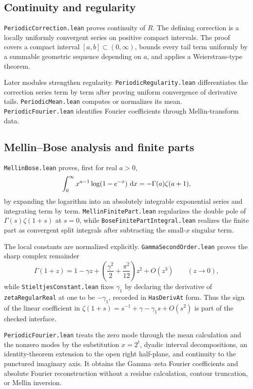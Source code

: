 \documentclass[11pt,oneside]{article}
\theoremstyle{definition}
\theoremstyle{remark}
\begin{document}
\subsection{Continuity and regularity}
\nolinkurl{PeriodicCorrection.lean} proves continuity of \(R\).  The defining correction is a locally uniformly convergent series on positive compact intervals.  The proof covers a compact interval \([a,b]\subset(0,\infty)\), bounds every tail term uniformly by a summable geometric sequence depending on \(a\), and applies a Weierstrass-type theorem.

Later modules strengthen regularity.  \nolinkurl{PeriodicRegularity.lean} differentiates the correction series term by term after proving uniform convergence of derivative tails.  \nolinkurl{PeriodicMean.lean} computes or normalizes its mean.  \nolinkurl{PeriodicFourier.lean} identifies Fourier coefficients through Mellin-transform data.

\subsection{Mellin--Bose analysis and finite parts}
\nolinkurl{MellinBose.lean} proves, first for real \(a>0\),
\[
 \int_0^\infty x^{a-1}\log(1-e^{-x})\,\mathop{}\!\mathrm{d} x
 =-\Gamma(a)\zeta(a+1),
\]
by expanding the logarithm into an absolutely integrable exponential series
and integrating term by term.  \nolinkurl{MellinFinitePart.lean} regularizes the
double pole of \(\Gamma(s)\zeta(1+s)\) at \(s=0\), while
\nolinkurl{BoseFinitePartIntegral.lean} realizes the finite part as convergent
split integrals after subtracting the small-\(x\) singular term.

The local constants are normalized explicitly.  \nolinkurl{GammaSecondOrder.lean}
proves the sharp complex remainder
\[
 \Gamma(1+z)=1-\gamma z+
 \left(\frac{\gamma^2}{2}+\frac{\pi^2}{12}\right)z^2+O(z^3)
 \qquad(z\to0),
\]
while \nolinkurl{StieltjesConstant.lean} fixes \(\gamma_1\) by declaring the
derivative of \nolinkurl{zetaRegularReal} at one to be \(-\gamma_1\), recorded
in \nolinkurl{HasDerivAt} form.  Thus the sign of the linear coefficient in
\(\zeta(1+s)=s^{-1}+\gamma-\gamma_1s+O(s^2)\) is part of the checked interface.

\nolinkurl{PeriodicFourier.lean} treats the zero mode through the mean calculation
and the nonzero modes by the substitution \(x=2^t\), dyadic interval
decompositions, an identity-theorem extension to the open right half-plane,
and continuity to the punctured imaginary axis.  It obtains the Gamma--zeta
Fourier coefficients and absolute Fourier reconstruction without a residue
calculation, contour truncation, or Mellin inversion.
\end{document}
